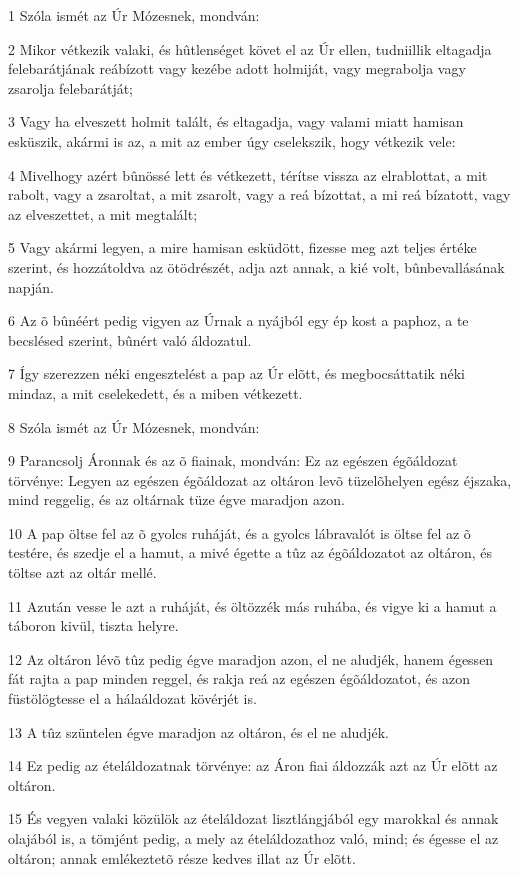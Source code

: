 \par 1 Szóla ismét az Úr Mózesnek, mondván:
\par 2 Mikor vétkezik valaki, és hûtlenséget követ el az Úr ellen, tudniillik eltagadja felebarátjának reábízott vagy kezébe adott holmiját, vagy megrabolja vagy zsarolja felebarátját;
\par 3 Vagy ha elveszett holmit talált, és eltagadja, vagy valami miatt hamisan esküszik, akármi is az, a mit az ember úgy cselekszik, hogy vétkezik vele:
\par 4 Mivelhogy azért bûnössé lett és vétkezett, térítse vissza az elrablottat, a mit rabolt, vagy a zsaroltat, a mit zsarolt, vagy a reá bízottat, a mi reá bízatott, vagy az elveszettet, a mit megtalált;
\par 5 Vagy akármi legyen, a mire hamisan esküdött, fizesse meg azt teljes értéke szerint, és hozzátoldva az ötödrészét, adja azt annak, a kié volt, bûnbevallásának napján.
\par 6 Az õ bûnéért pedig vigyen az Úrnak a nyájból egy ép kost a paphoz, a te becslésed szerint, bûnért való áldozatul.
\par 7 Így szerezzen néki engesztelést a pap az Úr elõtt, és megbocsáttatik néki mindaz, a mit cselekedett, és a miben vétkezett.
\par 8 Szóla ismét az Úr Mózesnek, mondván:
\par 9 Parancsolj Áronnak és az õ fiainak, mondván: Ez az egészen égõáldozat törvénye: Legyen az egészen égõáldozat az oltáron levõ tüzelõhelyen egész éjszaka, mind reggelig, és az oltárnak tüze égve maradjon azon.
\par 10 A pap öltse fel az õ gyolcs ruháját, és a gyolcs lábravalót is öltse fel az õ testére, és szedje el a hamut, a mivé égette a tûz az égõáldozatot az oltáron, és töltse azt az oltár mellé.
\par 11 Azután vesse le azt a ruháját, és öltözzék más ruhába, és vigye ki a hamut a táboron kivül, tiszta helyre.
\par 12 Az oltáron lévõ tûz pedig égve maradjon azon, el ne aludjék, hanem égessen fát rajta a pap minden reggel, és rakja reá az egészen égõáldozatot, és azon füstölögtesse el a hálaáldozat kövérjét is.
\par 13 A tûz szüntelen égve maradjon az oltáron, és el ne aludjék.
\par 14 Ez pedig az ételáldozatnak törvénye: az Áron fiai áldozzák azt az Úr elõtt az oltáron.
\par 15 És vegyen valaki közülök az ételáldozat lisztlángjából egy marokkal és annak olajából is, a tömjént pedig, a mely az ételáldozathoz való, mind; és égesse el az oltáron; annak emlékeztetõ része kedves illat az Úr elõtt.
